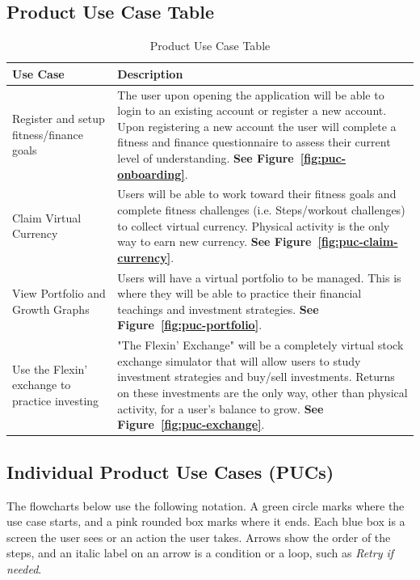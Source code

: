 \documentclass[12pt]{article}
\begin{document}
\subsection{Product Use Case Table}
\begin{table}[h!]
\centering
\begin{tabular}{|
    >{\centering\arraybackslash}p{4cm}|
    >{\centering\arraybackslash}p{8cm}|}
\hline
\textbf{Use Case} & \textbf{Description} \\ \hline

Register and setup fitness/finance goals &
The user upon opening the application will be able to login to an existing account or register a new account. Upon registering a new account the user will complete a fitness and finance questionnaire to assess their current level of understanding. \textbf{See Figure~\ref{fig:puc-onboarding}}.
\\ \hline
Claim Virtual Currency&
Users will be able to work toward their fitness goals and complete fitness challenges (i.e. Steps/workout challenges) to collect virtual currency. Physical activity is the only way to earn new currency. \textbf{See Figure~\ref{fig:puc-claim-currency}}.
\\ \hline
View Portfolio and Growth Graphs&
Users will have a virtual portfolio to be managed. This is where they will be able to practice their financial teachings and investment strategies. \textbf{See Figure~\ref{fig:puc-portfolio}}.
\\ \hline
Use the Flexin' exchange to practice investing& "The Flexin' Exchange" will be a completely virtual stock exchange simulator that will allow users to study investment strategies and buy/sell investments. Returns on these investments are the only way, other than physical activity, for a user's balance to grow. \textbf{See Figure~\ref{fig:puc-exchange}}.
\\ \hline
\end{tabular}
\caption{Product Use Case Table}
\end{table}

\subsection{Individual Product Use Cases (PUCs)}\label{acr:PUC}

The flowcharts below use the following notation. A green circle marks where the
use case starts, and a pink rounded box marks where it ends. Each blue box is a
screen the user sees or an action the user takes. Arrows show the order of the
steps, and an italic label on an arrow is a condition or a loop, such as
\emph{Retry if needed}.
\end{document}

